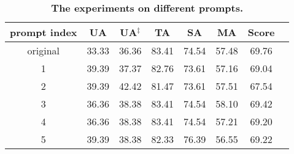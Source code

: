 \renewcommand{\arraystretch}{1.1}
\begin{table}[h]
\centering
\resizebox{1.0\linewidth}{!}
{
\begin{tabular}{cccccccc}\toprule
\bf prompt index & \bf UA & \bf UA$^{\ddag}$ & \bf TA  & \bf SA & \bf MA & \bf Score \\ \midrule
original & 33.33 & 36.36 &	83.41 &	74.54 &	57.48 &	69.76\\
1 &	39.39 & 37.37 &	82.76 &	73.61 &	57.16 &	69.04 \\
2 &	39.39 &	42.42 &	81.47 &	73.61 &	57.51 &	67.54 \\
3 &	36.36 &	38.38 &	83.41 &	74.54 &	58.10 &	69.42 \\
4 &	36.36 &	38.38 &	83.41 &	74.54 &	57.21 &	69.20 \\
5 &	39.39 &	38.38 &	82.33 &	76.39 &	56.55 &	69.22 \\ \bottomrule
\end{tabular}
}
\caption{\textbf{The experiments on different prompts.}}
\label{tab:diff_prompt}
\end{table}


